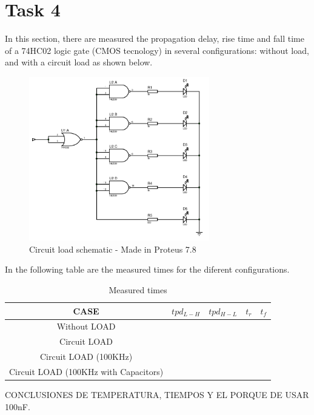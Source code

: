 


\section*{Task 4}
In this section, there are measured the 
propagation delay, rise time and fall time of
 a 74HC02 logic gate (CMOS tecnology) in 
 several configurations: without load, and with
  a circuit load as shown below.
  
  \begin{figure}[H]
    \begin{centering}
    \includegraphics[width=0.7\textwidth]{circuitLED}
    \par\end{centering}
    \caption{Circuit load schematic - Made in Proteus 7.8}
\end{figure}

In the following table are the measured times
for the diferent configurations.

\begin{table}[H]
    \begin{center}
    \begin{tabular}{|c|c|c|c|c|}
    \hline
    CASE & $tpd_{L-H}$ & $tpd_{H-L}$ & $t_r$ & $t_f$\\
    \hline \hline
    Without LOAD & & & &  \\ \hline
    Circuit LOAD & & & & \\ \hline
    Circuit LOAD (100KHz) & & & & \\ \hline
    Circuit LOAD (100KHz with Capacitors) & & & & \\ \hline
    \end{tabular}
    \caption{Measured times}
    \end{center}
\end{table}

CONCLUSIONES DE TEMPERATURA, TIEMPOS Y EL PORQUE
DE USAR 100nF.



